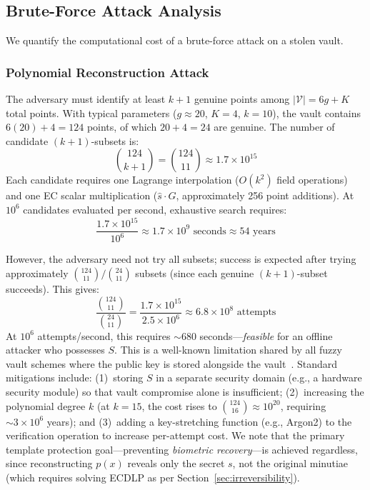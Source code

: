 \documentclass[3p,twocolumn]{elsarticle}
\begin{document}
\subsection{Brute-Force Attack Analysis}
\label{sec:brute_force}

We quantify the computational cost of a brute-force attack on a stolen vault.

\subsubsection{Polynomial Reconstruction Attack}
The adversary must identify at least $k+1$ genuine points among $|\mathcal{V}| = 6g + K$ total points. With typical parameters ($g \approx 20$, $K = 4$, $k = 10$), the vault contains $6(20) + 4 = 124$ points, of which $20 + 4 = 24$ are genuine. The number of candidate $(k+1)$-subsets is:
\begin{equation}
    \binom{124}{k+1} = \binom{124}{11} \approx 1.7 \times 10^{15}
    \label{eq:brute_force}
\end{equation}
Each candidate requires one Lagrange interpolation (${O}(k^2)$ field operations) and one EC scalar multiplication ($\hat{s} \cdot G$, approximately 256 point additions). At $10^6$ candidates evaluated per second, exhaustive search requires:
\begin{equation}
    \frac{1.7 \times 10^{15}}{10^6} \approx 1.7 \times 10^{9} \text{ seconds} \approx 54 \text{ years}
\end{equation}

However, the adversary need not try all subsets; success is expected after trying approximately $\binom{124}{11} / \binom{24}{11}$ subsets (since each genuine $(k+1)$-subset succeeds). This gives:
\begin{equation}
    \frac{\binom{124}{11}}{\binom{24}{11}} = \frac{1.7 \times 10^{15}}{2.5 \times 10^{6}} \approx 6.8 \times 10^{8} \text{ attempts}
\end{equation}
At $10^6$ attempts/second, this requires $\sim\!680$ seconds---\emph{feasible} for an offline attacker who possesses $S$. This is a well-known limitation shared by all fuzzy vault schemes where the public key is stored alongside the vault~\cite{tams2013attacks,nandakumar2007fuzzy}. Standard mitigations include: (1)~storing $S$ in a separate security domain (e.g., a hardware security module) so that vault compromise alone is insufficient; (2)~increasing the polynomial degree $k$ (at $k = 15$, the cost rises to $\binom{124}{16} \approx 10^{20}$, requiring $\sim\!3 \times 10^{6}$ years); and (3)~adding a key-stretching function (e.g., Argon2) to the verification operation to increase per-attempt cost. We note that the primary template protection goal---preventing \emph{biometric recovery}---is achieved regardless, since reconstructing $p(x)$ reveals only the secret $s$, not the original minutiae (which requires solving ECDLP as per Section~\ref{sec:irreversibility}).
\end{document}
